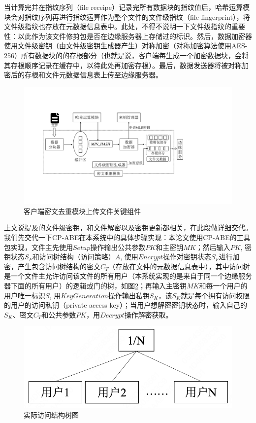\documentclass[promaster]{thesis-uestc}
\begin{document}
当计算完并在指纹序列（file receipe）记录完所有数据块的指纹值后，哈希运算模块会对指纹序列再进行指纹运算作为整个文件的文件级指纹（file fingerprint），将文件级指纹也存放在元数据信息表中。此处，不得不说明一下文件级指纹的重要性：以此作为该文件修剪包是否在边缘服务器上存储过的标识。然后，数据加密器使用文件级密钥（由文件级密钥生成器产生）对称加密（对称加密算法使用AES-256）所有数据块的的存根部分（也就是说，客户端每生成一个加密数据块，会将其存根顺序记录在缓存中，以待此处再加密存根）。最后，数据发送器将被对称加密后的存根和文件元数据信息表上传至边缘服务器。
\begin{figure}[htbp]
    \centering
    \includegraphics[width = 1.0\linewidth]{pic/密文重删模块.pdf}
    \caption{客户端密文去重模块上传文件关键组件}
    \label{密文去重模块上传文件关键组件}
\end{figure}

上文说提及的文件级密钥，和文件解密以及密钥更新都相关，在此段做详细交代。我们先交代一下CP-ABE在本系统中的具体步骤实现：本论文使用CP-ABE的工具包实现，文件主先使用$Setup$操作输出公共参数$PK$和主密钥$MK$；然后输入$PK$, 密钥状态$S_F$和访问树结构（访问策略）$A$, 使用$Encrypt$操作对密钥状态$S_F$进行加密，产生包含访问树结构的密文$C_T$（存放在文件的元数据信息表中），其中访问树是一个文件主允许访问该文件的所有用户（本系统实现的是来自于同一个边缘服务器下面的所有用户）的逻辑或门的树，如图\ref{实际访问结构树图}；再输入主密钥$MK$和每一个用户的用户唯一标识$S$, 用$Key Generation$操作输出私钥$S_K$，该$S_K$就是每个拥有访问权限的用户的访问私钥（private access key）；当用户想解密密钥状态时，输入自己的$S_K$、密文$C_T$和公共参数$PK$，用$Decrypt$操作解密获取。


\begin{figure}[htbp]
    \centering
    \includegraphics[width = 0.5\linewidth]{pic/访问结构树.png}
    \caption{实际访问结构树图}
    \label{实际访问结构树图}
\end{figure}
\end{document}
